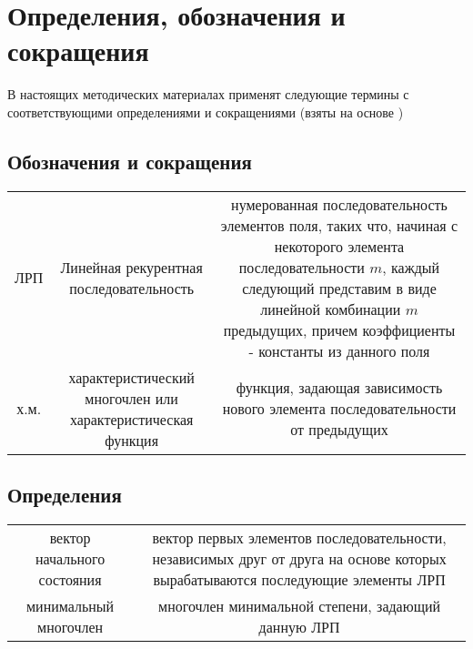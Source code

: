 \documentclass[utf8x, 14pt]{G7-32} %
\begin{document}
\frontmatter %

\maketitle %


\begin{executors}
\end{executors}




\tableofcontents
 
\chapter{Определения, обозначения и сокращения}
В настоящих методических материалах применят следующие термины с соответствующими определениями и сокращениями (взяты на основе \cite{LRS_additional})
\section{Обозначения и сокращения}
\begin{tabular}{ c c c }
 ЛРП & Линейная рекурентная последовательность & нумерованная последовательность элементов поля, таких что, начиная с некоторого элемента последовательности $m$, каждый следующий представим в виде линейной комбинации $m$ предыдущих, причем коэффициенты - константы из данного поля \\ 
 х.м. & характеристический многочлен или характеристическая функция & функция, задающая зависимость нового элемента последовательности от предыдущих
 \end{tabular}
 
 \section{Определения}
 \begin{tabular}{ c c }  
 вектор начального состояния & вектор первых элементов последовательности, независимых друг от друга на основе которых вырабатываются последующие элементы ЛРП \\
 минимальный многочлен & многочлен минимальной степени, задающий данную ЛРП
 \end{tabular}
\end{document}
